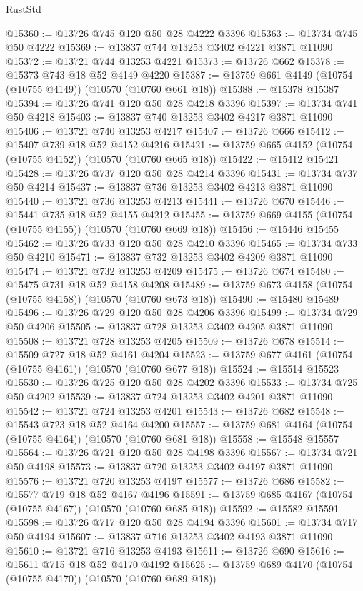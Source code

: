 \begin{lexlean}{RustStd}
\begin{coremodule}
@15360 := @13726 @745 @120 @50 @28 @4222 @3396
@15363 := @13734 @745 @50 @4222
@15369 := @13837 @744 @13253 @3402 @4221 @3871 @11090
@15372 := @13721 @744 @13253 @4221
@15373 := @13726 @662
@15378 := @15373 @743 @18 @52 @4149 @4220
@15387 := @13759 @661 @4149 (@10754 (@10755 @4149)) (@10570 (@10760 @661 @18))
@15388 := @15378 @15387
@15394 := @13726 @741 @120 @50 @28 @4218 @3396
@15397 := @13734 @741 @50 @4218
@15403 := @13837 @740 @13253 @3402 @4217 @3871 @11090
@15406 := @13721 @740 @13253 @4217
@15407 := @13726 @666
@15412 := @15407 @739 @18 @52 @4152 @4216
@15421 := @13759 @665 @4152 (@10754 (@10755 @4152)) (@10570 (@10760 @665 @18))
@15422 := @15412 @15421
@15428 := @13726 @737 @120 @50 @28 @4214 @3396
@15431 := @13734 @737 @50 @4214
@15437 := @13837 @736 @13253 @3402 @4213 @3871 @11090
@15440 := @13721 @736 @13253 @4213
@15441 := @13726 @670
@15446 := @15441 @735 @18 @52 @4155 @4212
@15455 := @13759 @669 @4155 (@10754 (@10755 @4155)) (@10570 (@10760 @669 @18))
@15456 := @15446 @15455
@15462 := @13726 @733 @120 @50 @28 @4210 @3396
@15465 := @13734 @733 @50 @4210
@15471 := @13837 @732 @13253 @3402 @4209 @3871 @11090
@15474 := @13721 @732 @13253 @4209
@15475 := @13726 @674
@15480 := @15475 @731 @18 @52 @4158 @4208
@15489 := @13759 @673 @4158 (@10754 (@10755 @4158)) (@10570 (@10760 @673 @18))
@15490 := @15480 @15489
@15496 := @13726 @729 @120 @50 @28 @4206 @3396
@15499 := @13734 @729 @50 @4206
@15505 := @13837 @728 @13253 @3402 @4205 @3871 @11090
@15508 := @13721 @728 @13253 @4205
@15509 := @13726 @678
@15514 := @15509 @727 @18 @52 @4161 @4204
@15523 := @13759 @677 @4161 (@10754 (@10755 @4161)) (@10570 (@10760 @677 @18))
@15524 := @15514 @15523
@15530 := @13726 @725 @120 @50 @28 @4202 @3396
@15533 := @13734 @725 @50 @4202
@15539 := @13837 @724 @13253 @3402 @4201 @3871 @11090
@15542 := @13721 @724 @13253 @4201
@15543 := @13726 @682
@15548 := @15543 @723 @18 @52 @4164 @4200
@15557 := @13759 @681 @4164 (@10754 (@10755 @4164)) (@10570 (@10760 @681 @18))
@15558 := @15548 @15557
@15564 := @13726 @721 @120 @50 @28 @4198 @3396
@15567 := @13734 @721 @50 @4198
@15573 := @13837 @720 @13253 @3402 @4197 @3871 @11090
@15576 := @13721 @720 @13253 @4197
@15577 := @13726 @686
@15582 := @15577 @719 @18 @52 @4167 @4196
@15591 := @13759 @685 @4167 (@10754 (@10755 @4167)) (@10570 (@10760 @685 @18))
@15592 := @15582 @15591
@15598 := @13726 @717 @120 @50 @28 @4194 @3396
@15601 := @13734 @717 @50 @4194
@15607 := @13837 @716 @13253 @3402 @4193 @3871 @11090
@15610 := @13721 @716 @13253 @4193
@15611 := @13726 @690
@15616 := @15611 @715 @18 @52 @4170 @4192
@15625 := @13759 @689 @4170 (@10754 (@10755 @4170)) (@10570 (@10760 @689 @18))

\end{coremodule}
\end{lexlean}
